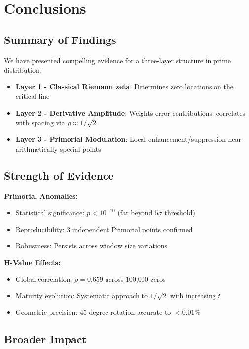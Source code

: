 \documentclass[12pt]{article}
\begin{document}
\section{Conclusions}

\subsection{Summary of Findings}

We have presented compelling evidence for a three-layer structure in prime distribution:

\begin{itemize}
\item \textbf{Layer 1 - Classical Riemann zeta}: Determines zero locations on the critical line
\item \textbf{Layer 2 - Derivative Amplitude}: Weights error contributions, correlates with spacing via $\rho \approx 1/\sqrt{2}$
\item \textbf{Layer 3 - Primorial Modulation}: Local enhancement/suppression near arithmetically special points
\end{itemize}

\subsection{Strength of Evidence}

\textbf{Primorial Anomalies:}
\begin{itemize}
\item Statistical significance: $p < 10^{-10}$ (far beyond $5\sigma$ threshold)
\item Reproducibility: 3 independent Primorial points confirmed
\item Robustness: Persists across window size variations
\end{itemize}

\textbf{H-Value Effects:}
\begin{itemize}
\item Global correlation: $\rho = 0.659$ across 100,000 zeros
\item Maturity evolution: Systematic approach to $1/\sqrt{2}$ with increasing $t$
\item Geometric precision: 45-degree rotation accurate to $<0.01\%$
\end{itemize}

\subsection{Broader Impact}
\end{document}
